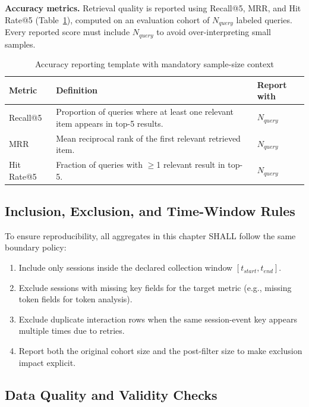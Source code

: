 \textbf{Accuracy metrics.}
Retrieval quality is reported using Recall@5, MRR, and Hit Rate@5 (Table~\ref{tab:accuracy_reporting_template}), computed on an evaluation cohort of $N_{query}$ labeled queries. Every reported score must include $N_{query}$ to avoid over-interpreting small samples.

\begin{table}[H]
\centering
\begin{tabular}{p{2.8cm}p{8.4cm}p{2.4cm}}
\toprule
\textbf{Metric} & \textbf{Definition} & \textbf{Report with}\\
\midrule
Recall@5 & Proportion of queries where at least one relevant item appears in top-5 results. & $N_{query}$\\
MRR & Mean reciprocal rank of the first relevant retrieved item. & $N_{query}$\\
Hit Rate@5 & Fraction of queries with $\geq$1 relevant result in top-5. & $N_{query}$\\
\bottomrule
\end{tabular}
\caption{Accuracy reporting template with mandatory sample-size context}
\label{tab:accuracy_reporting_template}
\end{table}

\subsection{Inclusion, Exclusion, and Time-Window Rules}
\label{subsec:inclusion_exclusion_rules}

To ensure reproducibility, all aggregates in this chapter SHALL follow the same boundary policy:
\begin{enumerate}
    \item Include only sessions inside the declared collection window $[t_{start}, t_{end}]$.
    \item Exclude sessions with missing key fields for the target metric (e.g., missing token fields for token analysis).
    \item Exclude duplicate interaction rows when the same session-event key appears multiple times due to retries.
    \item Report both the original cohort size and the post-filter size to make exclusion impact explicit.
\end{enumerate}

\subsection{Data Quality and Validity Checks}
\label{subsec:data_quality_validity}

